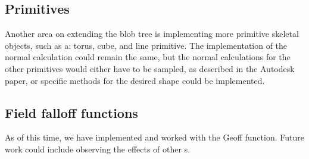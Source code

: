 \documentclass[conference]{acmsiggraph}
\begin{document}
\subsection{Primitives}
Another area on extending the blob tree is implementing more primitive skeletal
objects, such as a: torus, cube, and line primitive. The implementation of the
normal calculation could remain the same, but the normal calculations for the
other primitives would either have to be sampled, as described in the Autodesk
paper, or specific methods for the desired shape could be implemented.

\subsection{Field falloff functions}
As of this time, we have implemented and worked with the Geoff function. Future
work could include observing the effects of other \fff s.



\end{document}
